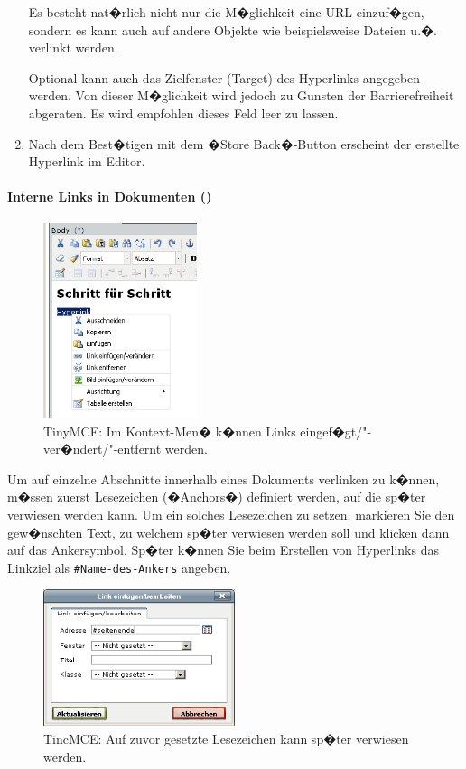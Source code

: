\begin{enumerate}
{    \begin{Hinweis}
      Es besteht nat�rlich nicht nur die M�glichkeit eine URL
      einzuf�gen, sondern es kann auch auf andere Objekte wie
      beispielsweise Dateien u.�. verlinkt werden.
    \end{Hinweis}

    Optional kann auch das Zielfenster (Target) des Hyperlinks angegeben
    werden. Von dieser M�glichkeit wird jedoch zu Gunsten der Barrierefreiheit
    abgeraten. Es wird empfohlen dieses Feld leer zu lassen.}
\item {Nach dem Best�tigen mit dem �Store Back�-Button erscheint der erstellte
    Hyperlink im Editor.}
\end{enumerate}

\paragraph{Interne Links in Dokumenten ()}

\begin{figure}[!ht]
	\centering
		\includegraphics[width=0.4\textwidth]{./images/tinycontextimage.png}
	\caption{TinyMCE: Im Kontext-Men� k�nnen Links
eingef�gt/"-ver�ndert/"-entfernt werden.}
	\label{fig:tinycontextimage}
\end{figure}

Um auf einzelne Abschnitte innerhalb eines Dokuments verlinken zu k�nnen,
m�ssen zuerst Lesezeichen (�Anchors�) definiert werden, auf die sp�ter verwiesen
werden kann. Um ein solches Lesezeichen zu setzen, markieren Sie den
gew�nschten Text, zu welchem sp�ter verwiesen werden soll und klicken dann auf
das Ankersymbol. Sp�ter k�nnen Sie beim Erstellen von Hyperlinks das
Linkziel als \texttt{\#Name-des-Ankers} angeben.

\begin{figure}[!ht]
	\centering
		\includegraphics[width=0.5\textwidth]{./images/tinylinkanchor.png}
	\caption{TincMCE: Auf zuvor gesetzte Lesezeichen kann
sp�ter verwiesen werden.}
	\label{fig:tinyankerdialog}
\end{figure}

